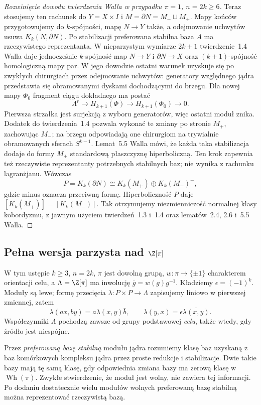 \begin{proof}[Rozwinięcie dowodu twierdzenia Walla w przypadku
 $\pi=1$, $n=2k\geq6$]
Teraz stosujemy ten rachunek do
$Y=X\times I$ i $M=\partial N=M_-\sqcup M_+$.
Mapy końców przygotowujemy do
$k$-spójności, mapę $N\to Y$ także,
a odejmowanie uchwytów usuwa
$K_k(N,\partial N)$. Po stabilizacji
preferowana stabilna baza $A$ ma
rzeczywistego reprezentanta.
W nieparzystym wymiarze $2k+1$
twierdzenie~1.4 Walla daje jednocześnie
$k$-spójność map $N\to Y$ i $\partial N\to X$
oraz $(k+1)$-spójność homologiczną mapy par.
W jego dowodzie ostatni warunek uzyskuje się
po zwykłych chirurgiach przez odejmowanie
uchwytów: generatory względnego jądra
przedstawia się obramowanymi dyskami
dochodzącymi do brzegu. Dla nowej mapy
$\Phi_0$ fragment ciągu dokładnego ma postać
\[
 \Lambda^r\longrightarrow H_{k+1}(\Phi)
 \longrightarrow H_{k+1}(\Phi_0)\longrightarrow0.
\]
Pierwsza strzałka jest surjekcją z wyboru
generatorów, więc ostatni moduł znika.
Dodatek do twierdzenia~1.4 pozwala wykonać
te zmiany po stronie $M_+$, zachowując $M_-$;
na brzegu odpowiadają one chirurgiom na
trywialnie obramowanych sferach $S^{k-1}$.
Lemat~5.5 Walla mówi, że każda taka
stabilizacja dodaje do formy $M_+$ standardową
płaszczyznę hiperboliczną. Ten krok zapewnia
też rzeczywiste reprezentanty potrzebnych
stabilnych baz; nie wynika z rachunku
lagranżjanu. Wówczas
\[
 P=K_k(\partial N)
 \cong K_k(M_+)\oplus K_k(M_-)^{-},
\]
gdzie minus oznacza przeciwną formę.
Hiperboliczność $P$ daje
$[K_k(M_+)]=[K_k(M_-)]$.
Tak otrzymujemy niezmienniczość
normalnej klasy kobordyzmu, z jawnym
użyciem twierdzeń~1.3 i~1.4 oraz
lematów~2.4, 2.6 i~5.5 Walla.
\end{proof}

\subsection*{Pełna wersja parzysta nad \texorpdfstring{$\Z[\pi]$}{Z[pi]}}

W tym ustępie $k\geq3$, $n=2k$, $\pi$ jest dowolną grupą,
$w:\pi\to\{\pm1\}$ charakterem orientacji celu, a
$\Lambda=\Z[\pi]$ ma inwolucję
$\overline g=w(g)g^{-1}$. Kładziemy
$\epsilon=(-1)^k$. Moduły są lewe; formę przecięcia
$\lambda:P\times P\to\Lambda$ zapisujemy liniowo w pierwszej
zmiennej, zatem
\[
 \lambda(ax,by)=a\lambda(x,y)\bar b,
 \qquad \lambda(y,x)=\epsilon\overline{\lambda(x,y)}.
\]
Współczynniki $\Lambda$ pochodzą zawsze od grupy podstawowej
\emph{celu}, także wtedy, gdy źródło jest niespójne.

Przez \emph{preferowaną bazę stabilną} modułu jądra rozumiemy
klasę baz uzyskaną z baz komórkowych kompleksu jądra przez
proste redukcje i stabilizacje. Dwie takie bazy mają tę samą
klasę, gdy odpowiednia zmiana bazy ma zerową klasę
w $\operatorname{Wh}(\pi)$. Zwykłe stwierdzenie, że moduł jest
wolny, nie zawiera tej informacji. Po dodaniu dostatecznie wielu
modułów wolnych preferowaną bazę stabilną można reprezentować
rzeczywistą bazą.

